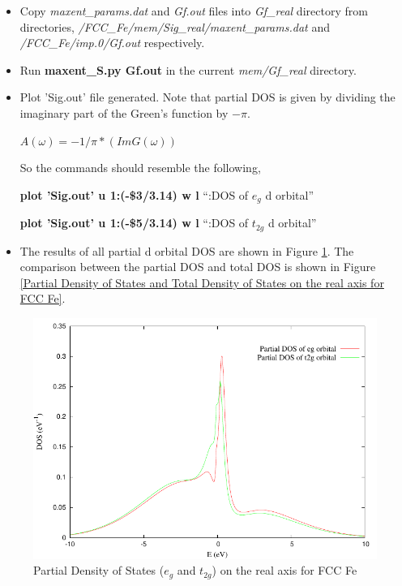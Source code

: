 \documentclass[12 pt]{article}
\begin{document}
\begin{itemize}[leftmargin=0in]
\begin{itemize}[leftmargin=0.2in]
    \item Copy \emph{maxent\_params.dat} and \emph{Gf.out} files into \emph{Gf\_real} directory from directories, 
\emph{/FCC\_Fe/mem/Sig\_real/maxent\_params.dat} and \emph{/FCC\_Fe/imp.0/Gf.out} respectively.

    \item Run \textbf{maxent\_S.py Gf.out} in the current \emph{mem/Gf\_real} directory.

    \item Plot 'Sig.out' file generated. Note that partial DOS is given by dividing the imaginary part of the Green's 
function by $-\pi$.

  $A(\omega) = -1/\pi*(Im G(\omega))$

  So the commands should resemble the following,

  \textbf{plot 'Sig.out' u 1:(-\$3/3.14) w l} ``:DOS of $e_g$ d orbital''

  \textbf{plot 'Sig.out' u 1:(-\$5/3.14) w l} ``:DOS of $t_{2g}$ d orbital''

    \item The results of all partial d orbital DOS are shown in Figure 
\ref{Partial Density of States (eg and t2g) on the real axis for FCC Fe}. The comparison between the partial DOS and 
total DOS is shown in Figure \ref{Partial Density of States and Total Density of States on the real axis for FCC Fe}.

  \end{itemize}
	  
	      \end{itemize}

  \cleardoublepage

  \begin{figure}[ht]
    \centering
    \caption{Partial Density of States ($e_g$ and $t_{2g}$) on the real axis for FCC Fe}
    \label{Partial Density of States (eg and t2g) on the real axis for FCC Fe}
    \vspace{2ex}
    \includegraphics[scale=1.3]{gnuplotPartialDOS}
  \end{figure}
\end{document}
